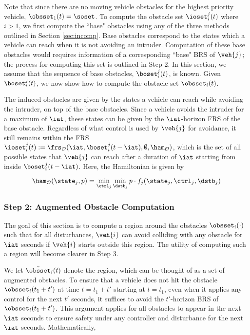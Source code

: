 Note that since there are no moving vehicle obstacles for the highest priority vehicle, $\obsset_1(t) = \soset$. To compute the obstacle set $\ioset_i^j(t)$ where $i> 1$, we first compute the ``base" obstacles using any of the three methods outlined in Section \ref{sec:incomp}. Base obstacles correspond to the states which a vehicle can reach when it is not avoiding an intruder. Computation of these base obstacles would requires information of a corresponding ``base" BRS of $\veh{j}$; the process for computing this set is outlined in Step 2. In this section, we assume that the sequence of base obstacles, $\boset_i^j(t)$, is known. Given $\boset_i^j(t)$, we now show how to compute the obstacle set $\obsset_i(t)$. 

The induced obstacles are given by the states a vehicle can reach while avoiding the intruder, on top of the base obstacles. Since a vehicle avoids the intruder for a maximum of $\iat$, these states can be given by the $\iat$-horizon FRS of the base obstacle. Regardless of what control is used by $\veh{j}$ for avoidance, it still remains within the FRS $\ioset_i^j(t) := \frs_{\mathcal{O}}(\iat, \boset_i^j(t-\iat), \emptyset, \ham_{\mathcal{O}})$, which is the set of all possible states that $\veh{j}$ can reach after a duration of $\iat$ starting from inside $\boset_i^j(t-\iat)$. Here, the Hamiltonian is given by

\begin{equation}
\ham_{\mathcal{O}}(\state_j, p) = \min_{\ctrl_j} \min_{\dstb_j} p \cdot f_j (\state_j, \ctrl_j, \dstb_j)
\end{equation}

\subsubsection{Step 2: Augmented Obstacle Computation \label{sec:intruder_aocomp}}
The goal of this section is to compute a region around the obstacles $\obsset_i(\cdot)$ such that for all disturbances, $\veh{i}$ can avoid colliding with any obstacle for $\iat$ seconds if $\veh{i}$ starts outside this region. The utility of computing such a region will become clearer in Step 3. 

We let $\tilde\obsset_i(t)$ denote the region, which can be thought of as a set of augmented obstacles. To ensure that a vehicle does not hit the obstacle $\obsset_i(t_1 + t')$ at time $t = t_1 + t'$ starting at $t = t_1$, even when it applies any control for the next $t'$ seconds, it suffices to avoid the $t'$-horizon BRS of $\obsset_i(t_1 + t')$. This argument applies for all obstacles to appear in the next $\iat$ seconds to ensure safety under any controller and disturbance for the next $\iat$ seconds. Mathematically,

